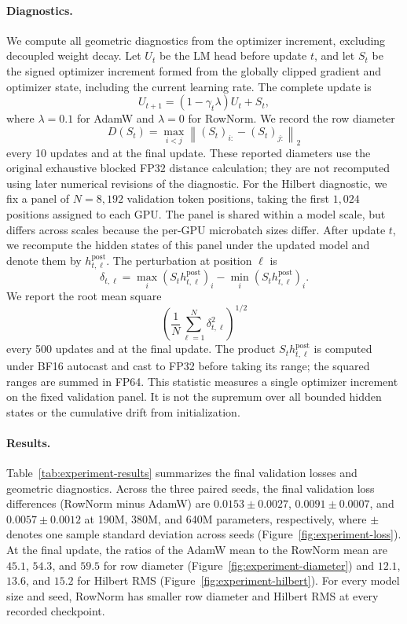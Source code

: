 \documentclass[anon]{opt2026} %
\newcommand{\norm}[1]{\left\lVert #1\right\rVert}
\begin{document}
\paragraph{Diagnostics.}
We compute all geometric diagnostics from the optimizer increment, excluding
decoupled weight decay. Let $U_t$ be the LM head before update $t$, and let
$S_t$ be the signed optimizer increment formed from the globally clipped
gradient and optimizer state, including the current learning rate. The complete
update is
\[
U_{t+1}=(1-\gamma_t\lambda)U_t+S_t,
\]
where $\lambda=0.1$ for AdamW and $\lambda=0$ for RowNorm. We record the row diameter
\[
D(S_t)=\max_{i<j}\norm{(S_t)_{i:}-(S_t)_{j:}}_2
\]
every 10 updates and at the final update. These reported diameters use the original exhaustive blocked FP32 distance calculation; they are not recomputed using later numerical revisions of the diagnostic. For the Hilbert diagnostic, we fix a panel of $N=8{,}192$ validation token positions, taking the first $1{,}024$ positions assigned to each GPU. The panel is shared within a model scale, but differs across scales because the per-GPU microbatch sizes differ. After update $t$, we recompute the hidden states of this panel under the updated model and denote them by $h_{t,\ell}^{\mathrm{post}}$. The perturbation at position
$\ell$ is
\[
\delta_{t,\ell}
=
\max_i(S_t h_{t,\ell}^\mathrm{post})_i-\min_i(S_t h_{t,\ell}^\mathrm{post})_i.
\]
We report the root mean square
\[
\left(\frac{1}{N}\sum_{\ell=1}^N \delta_{t,\ell}^2\right)^{1/2}
\]
every 500 updates and at the final update. The product $S_t h_{t,\ell}^{\mathrm{post}}$ is computed under BF16 autocast and cast to FP32 before taking its range; the squared ranges are summed in FP64. This statistic measures a single
optimizer increment on the fixed validation panel. It is not the supremum over
all bounded hidden states or the cumulative drift from initialization.


\paragraph{Results.}
Table~\ref{tab:experiment-results} summarizes the final validation losses and geometric diagnostics.
Across the three paired seeds, the final validation loss differences
(RowNorm minus AdamW) are $0.0153\pm0.0027$, $0.0091\pm0.0007$, and
$0.0057\pm0.0012$ at 190M, 380M, and 640M parameters, respectively, where
$\pm$ denotes one sample standard deviation across seeds
(Figure~\ref{fig:experiment-loss}). At the final update, the ratios of the
AdamW mean to the RowNorm mean are $45.1$, $54.3$, and $59.5$ for row
diameter (Figure~\ref{fig:experiment-diameter}) and $12.1$, $13.6$, and
$15.2$ for Hilbert RMS (Figure~\ref{fig:experiment-hilbert}). For every
model size and seed, RowNorm has smaller row diameter and Hilbert RMS at every
recorded checkpoint.
\end{document}
